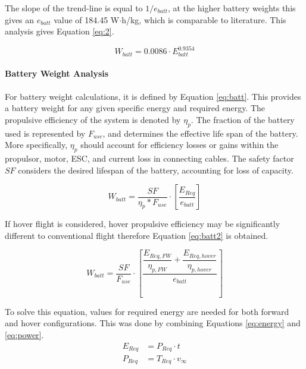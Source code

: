 The slope of the trend-line is equal to $1/e_{batt}$, at the higher battery weights this gives an $e_{batt}$ value of 184.45 W$\cdot$h/kg, which is comparable to literature. This analysis gives Equation \ref{eq:2}.

\begin{equation}
    W_{batt} = 0.0086\cdot E_{batt}^{0.9354}
    \label{eq:2}
\end{equation}



\paragraph{Battery Weight Analysis}

For battery weight calculations, it is defined by Equation \ref{eq:batt}. This provides a battery weight for any given specific energy and required energy. The propulsive efficiency of the system is denoted by $\eta_p$. The fraction of the battery used is represented by $F_{use}$, and determines the effective life span of the battery. More specifically, $\eta_p$ should account for efficiency losses or gains within the propulsor, motor, ESC, and current loss in connecting cables. The safety factor $SF$ considers the desired lifespan of the battery, accounting for loss of capacity. 


\begin{equation}
    W_{batt} = \dfrac{SF}{\eta_p*F_{use}} \cdot \left[ \dfrac{E_{Req}}{e_{batt}} \right]
    \label{eq:batt}
\end{equation}

If hover flight is considered, hover propulsive efficiency may be significantly different to conventional flight therefore Equation \ref{eq:batt2} is obtained.

\begin{equation}
    W_{batt} = \dfrac{SF}{F_{use}} \cdot \left[ \dfrac{\dfrac{E_{Req, FW}}{\eta_{p, FW}} + \dfrac{E_{Req, hover}}{\eta_{p, hover}}}{e_{batt}} \right]
    \label{eq:batt2}
\end{equation}

To solve this equation, values for required energy are needed for both forward and hover configurations. This was done by combining Equations \ref{eq:energy} and \ref{eq:power}.
\begin{align}
    E_{Req} &= P_{Req}\cdot t \label{eq:energy}\\
    P_{Req} &= T_{Req} \cdot v_{\infty} \label{eq:power}
\end{align}

